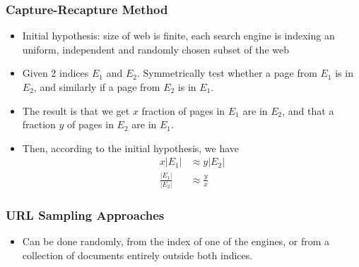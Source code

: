 \documentclass{article}
\begin{document}
\subsubsection{Capture-Recapture Method}
\begin{itemize}
    \item Initial hypothesis: size of web is finite, each search engine is indexing an uniform, independent and randomly chosen subset of the web
    
    \item Given 2 indices $E_1$ and $E_2$. Symmetrically test whether a page from $E_1$ is in $E_2$, and similarly if a page from $E_2$ is in $E_1$. 
    
    \item The result is that we get $x$ fraction of pages in $E_1$ are in $E_2$, and that a fraction $y$ of pages in $E_2$ are in $E_1$. 
    
    \item Then, according to the initial hypothesis, we have
    \begin{align*}
        x |E_1| &\approx y |E_2| \\
        \frac{|E_1|}{|E_2|} &\approx \frac{y}{x}
    \end{align*}
\end{itemize}

\subsubsection{URL Sampling Approaches}
\begin{itemize}
    \item Can be done randomly, from the index of one of the engines, or from a collection of documents entirely outside both indices. 
\end{itemize}
\end{document}
